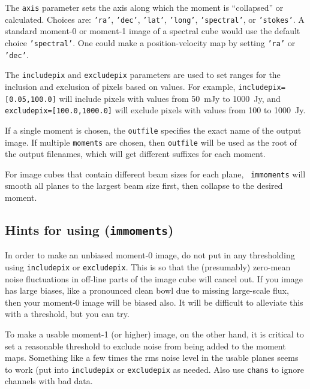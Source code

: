 The {\tt axis} parameter sets the axis along which the moment is
``collapsed'' or calculated.  Choices are: 
{\tt 'ra'}, {\tt 'dec'}, {\tt 'lat'}, {\tt 'long'}, {\tt 'spectral'},
or {\tt 'stokes'}.  A standard moment-0 or moment-1 image of
a spectral cube would use the default choice {\tt 'spectral'}.
One could make a position-velocity map by setting {\tt 'ra'} or 
{\tt 'dec'}.

The {\tt includepix} and {\tt excludepix} parameters are used to set
ranges for the inclusion and exclusion of pixels based on values.
For example, {\tt includepix=[0.05,100.0]} will include pixels
with values from 50~mJy to 1000~Jy, and 
{\tt excludepix=[100.0,1000.0]} will exclude pixels with values
from 100 to 1000~Jy.

If a single moment is chosen, the {\tt outfile} specifies the exact
name of the output image.  If multiple {\tt moments} are chosen,
then {\tt outfile} will be used as the root of the output filenames,
which will get different suffixes for each moment.  

For image cubes that contain different beam sizes for each plane, {\tt
  immoments} will smooth all planes to the largest beam size first, then
collapse to the desired moment.

\subsection{Hints for using ({\tt immoments})}
\label{section:analysis.moments.hints}

In order to make an unbiased moment-0 image, do not put in 
any thresholding using {\tt includepix} or {\tt excludepix}.
This is so that the (presumably) zero-mean noise fluctuations
in off-line parts of the image cube will cancel out.  If you
image has large biases, like a pronounced clean bowl due to
missing large-scale flux, then your moment-0 image will be biased
also.  It will be difficult to alleviate this with a threshold,
but you can try.

To make a usable moment-1 (or higher) image, on the other hand,
it is critical to set a
reasonable threshold to exclude noise from being added to the
moment maps.  Something like a few times the rms noise level
in the usable planes seems to work (put into {\tt includepix}
or {\tt excludepix} as needed.  Also use {\tt chans} to ignore
channels with bad data.

